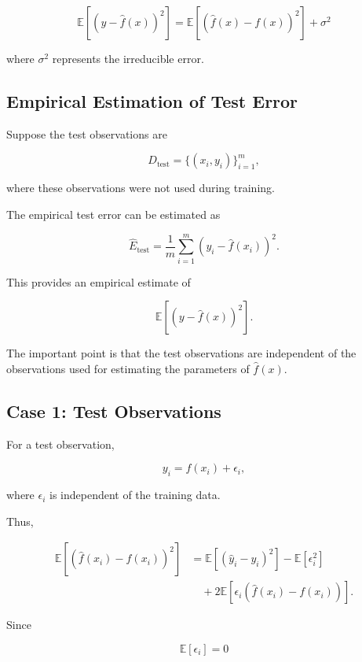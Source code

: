 \documentclass{article}
\begin{document}
\begin{equation}
	\boxed{
		\mathbb{E}\left[(y-\hat{f}(x))^2\right]
		=
		\mathbb{E}\left[
		(\hat{f}(x)-f(x))^2
		\right]
		+\sigma^2
	}
\end{equation}

where $\sigma^2$ represents the irreducible error.

\subsection{Empirical Estimation of Test Error}

Suppose the test observations are

\[
D_{\mathrm{test}}
=
\{(x_i,y_i)\}_{i=1}^{m},
\]

where these observations were not used during training.

The empirical test error can be estimated as

\begin{equation}
	\widehat{E}_{\mathrm{test}}
	=
	\frac{1}{m}
	\sum_{i=1}^{m}
	(y_i-\hat{f}(x_i))^2.
\end{equation}

This provides an empirical estimate of

\[
\mathbb{E}\left[(y-\hat{f}(x))^2\right].
\]

The important point is that the test observations are independent of the observations used for estimating the parameters of $\hat{f}(x)$.

\subsection{Case 1: Test Observations}

For a test observation,

\[
y_i=f(x_i)+\epsilon_i,
\]

where $\epsilon_i$ is independent of the training data.

Thus,

\begin{align}
	\mathbb{E}\left[
	\left(\hat{f}(x_i)-f(x_i)\right)^2
	\right]
	&=
	\mathbb{E}\left[
	(\hat{y}_i-y_i)^2
	\right]
	-\mathbb{E}[\epsilon_i^2] \\
	&\quad
	+2\mathbb{E}\left[
	\epsilon_i
	\left(\hat{f}(x_i)-f(x_i)\right)
	\right].
\end{align}

Since

\[
\mathbb{E}[\epsilon_i]=0
\]
\end{document}
